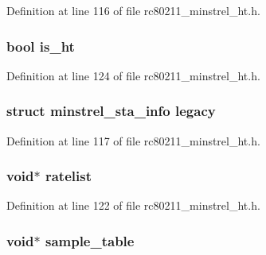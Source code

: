 Definition at line 116 of file rc80211\-\_\-minstrel\-\_\-ht.\-h.

\hypertarget{structminstrel__ht__sta__priv_a691fcae1200883f0309751d54945e68b}{
\subsubsection[{is\-\_\-ht}]{\setlength{\rightskip}{0pt plus 5cm}bool is\-\_\-ht}}\label{structminstrel__ht__sta__priv_a691fcae1200883f0309751d54945e68b}


Definition at line 124 of file rc80211\-\_\-minstrel\-\_\-ht.\-h.

\hypertarget{structminstrel__ht__sta__priv_aa23bd315f4b740dbf665fd13992b2042}{
\subsubsection[{legacy}]{\setlength{\rightskip}{0pt plus 5cm}struct {\bf minstrel\-\_\-sta\-\_\-info} legacy}}\label{structminstrel__ht__sta__priv_aa23bd315f4b740dbf665fd13992b2042}


Definition at line 117 of file rc80211\-\_\-minstrel\-\_\-ht.\-h.

\hypertarget{structminstrel__ht__sta__priv_ad4ac07580c58cd424321fd2e4a8cf800}{
\subsubsection[{ratelist}]{\setlength{\rightskip}{0pt plus 5cm}void$\ast$ ratelist}}\label{structminstrel__ht__sta__priv_ad4ac07580c58cd424321fd2e4a8cf800}


Definition at line 122 of file rc80211\-\_\-minstrel\-\_\-ht.\-h.

\hypertarget{structminstrel__ht__sta__priv_a3e6baa12c7e2d9d85f9c06542a62063e}{
\subsubsection[{sample\-\_\-table}]{\setlength{\rightskip}{0pt plus 5cm}void$\ast$ sample\-\_\-table}}\label{structminstrel__ht__sta__priv_a3e6baa12c7e2d9d85f9c06542a62063e}


